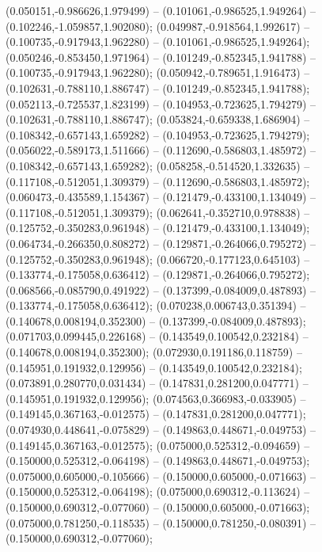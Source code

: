  (0.050151,-0.986626,1.979499) -- (0.101061,-0.986525,1.949264) -- (0.102246,-1.059857,1.902080);
 (0.049987,-0.918564,1.992617) -- (0.100735,-0.917943,1.962280) -- (0.101061,-0.986525,1.949264);
 (0.050246,-0.853450,1.971964) -- (0.101249,-0.852345,1.941788) -- (0.100735,-0.917943,1.962280);
 (0.050942,-0.789651,1.916473) -- (0.102631,-0.788110,1.886747) -- (0.101249,-0.852345,1.941788);
 (0.052113,-0.725537,1.823199) -- (0.104953,-0.723625,1.794279) -- (0.102631,-0.788110,1.886747);
 (0.053824,-0.659338,1.686904) -- (0.108342,-0.657143,1.659282) -- (0.104953,-0.723625,1.794279);
 (0.056022,-0.589173,1.511666) -- (0.112690,-0.586803,1.485972) -- (0.108342,-0.657143,1.659282);
 (0.058258,-0.514520,1.332635) -- (0.117108,-0.512051,1.309379) -- (0.112690,-0.586803,1.485972);
 (0.060473,-0.435589,1.154367) -- (0.121479,-0.433100,1.134049) -- (0.117108,-0.512051,1.309379);
 (0.062641,-0.352710,0.978838) -- (0.125752,-0.350283,0.961948) -- (0.121479,-0.433100,1.134049);
 (0.064734,-0.266350,0.808272) -- (0.129871,-0.264066,0.795272) -- (0.125752,-0.350283,0.961948);
 (0.066720,-0.177123,0.645103) -- (0.133774,-0.175058,0.636412) -- (0.129871,-0.264066,0.795272);
 (0.068566,-0.085790,0.491922) -- (0.137399,-0.084009,0.487893) -- (0.133774,-0.175058,0.636412);
 (0.070238,0.006743,0.351394) -- (0.140678,0.008194,0.352300) -- (0.137399,-0.084009,0.487893);
 (0.071703,0.099445,0.226168) -- (0.143549,0.100542,0.232184) -- (0.140678,0.008194,0.352300);
 (0.072930,0.191186,0.118759) -- (0.145951,0.191932,0.129956) -- (0.143549,0.100542,0.232184);
 (0.073891,0.280770,0.031434) -- (0.147831,0.281200,0.047771) -- (0.145951,0.191932,0.129956);
 (0.074563,0.366983,-0.033905) -- (0.149145,0.367163,-0.012575) -- (0.147831,0.281200,0.047771);
 (0.074930,0.448641,-0.075829) -- (0.149863,0.448671,-0.049753) -- (0.149145,0.367163,-0.012575);
 (0.075000,0.525312,-0.094659) -- (0.150000,0.525312,-0.064198) -- (0.149863,0.448671,-0.049753);
 (0.075000,0.605000,-0.105666) -- (0.150000,0.605000,-0.071663) -- (0.150000,0.525312,-0.064198);
 (0.075000,0.690312,-0.113624) -- (0.150000,0.690312,-0.077060) -- (0.150000,0.605000,-0.071663);
 (0.075000,0.781250,-0.118535) -- (0.150000,0.781250,-0.080391) -- (0.150000,0.690312,-0.077060);
